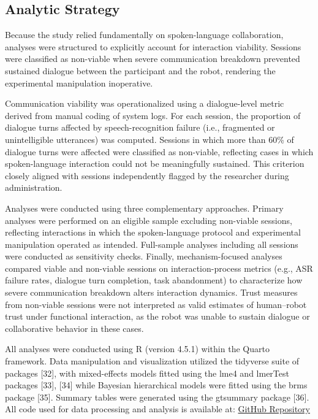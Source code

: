 \documentclass[
  letterpaper,
  DIV=11,
  numbers=noendperiod]{scrartcl}
\begin{document}
\begin{table}
{}

\end{table}%

\subsection{Analytic Strategy}\label{analytic-strategy}

Because the study relied fundamentally on spoken-language collaboration,
analyses were structured to explicitly account for interaction
viability. Sessions were classified as non-viable when severe
communication breakdown prevented sustained dialogue between the
participant and the robot, rendering the experimental manipulation
inoperative.

Communication viability was operationalized using a dialogue-level
metric derived from manual coding of system logs. For each session, the
proportion of dialogue turns affected by speech-recognition failure
(i.e., fragmented or unintelligible utterances) was computed. Sessions
in which more than 60\% of dialogue turns were affected were classified
as non-viable, reflecting cases in which spoken-language interaction
could not be meaningfully sustained. This criterion closely aligned with
sessions independently flagged by the researcher during administration.

Analyses were conducted using three complementary approaches. Primary
analyses were performed on an eligible sample excluding non-viable
sessions, reflecting interactions in which the spoken-language protocol
and experimental manipulation operated as intended. Full-sample analyses
including all sessions were conducted as sensitivity checks. Finally,
mechanism-focused analyses compared viable and non-viable sessions on
interaction-process metrics (e.g., ASR failure rates, dialogue turn
completion, task abandonment) to characterize how severe communication
breakdown alters interaction dynamics. Trust measures from non-viable
sessions were not interpreted as valid estimates of human--robot trust
under functional interaction, as the robot was unable to sustain
dialogue or collaborative behavior in these cases.

All analyses were conducted using R (version 4.5.1) within the Quarto
framework. Data manipulation and visualization utilized the tidyverse
suite of packages {[}32{]}, with mixed-effects models fitted using the
lme4 and lmerTest packages {[}33{]}, {[}34{]} while Bayesian
hierarchical models were fitted using the brms package {[}35{]}. Summary
tables were generated using the gtsummary package {[}36{]}. All code
used for data processing and analysis is available at:
\href{https://github.com/shaunaheron2/misty-paper}{GitHub Repository}
\end{document}
